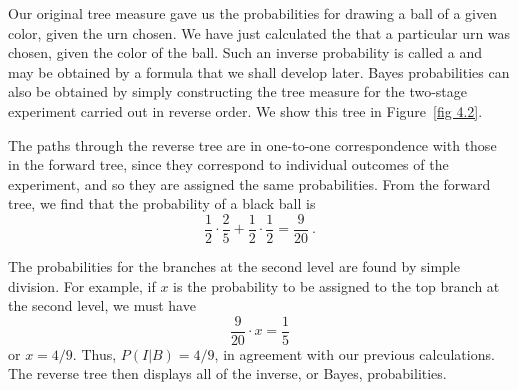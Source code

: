 Our original tree measure gave us the probabilities for drawing a ball of a
given color, given the urn chosen.  We have just calculated the  that a particular urn was chosen, given the color of the ball. 
Such an inverse probability is called a  and may be obtained by a formula that we shall develop
later.  Bayes probabilities can also be obtained by simply constructing the tree measure for the
two-stage experiment carried out in reverse order.  We show this tree in Figure~\ref{fig 4.2}.


The paths through the reverse tree are in one-to-one correspondence with those in the forward
tree, since they correspond to individual outcomes of the experiment, and so they are assigned
the same probabilities.  From the forward tree, we find that the probability of a black ball is
$$
\frac 12 \cdot \frac 25 + \frac 12 \cdot \frac 12 = \frac 9{20}\ .
$$

The probabilities for the branches at the second level are found by simple
division.  For example, if $x$ is the probability to be assigned to the top
branch at the second level, we must have
$$
\frac 9{20} \cdot x = \frac 15
$$
or $x = 4/9$.  Thus, $P(I|B) = 4/9$, in agreement with our previous
calculations.  The reverse tree then displays all of the inverse, or Bayes,
probabilities.  

